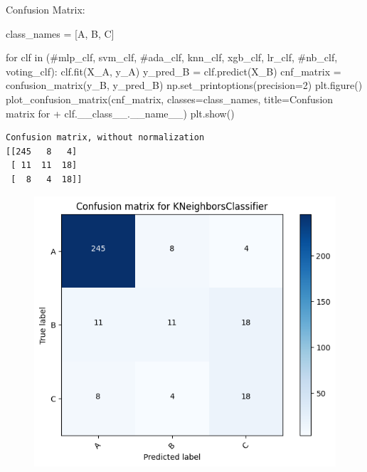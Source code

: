 \documentclass[
  letterpaper,
  DIV=11,
  numbers=noendperiod]{scrartcl}
\newenvironment{Shaded}{\begin{snugshade}}{\end{snugshade}}
\newcommand{\CommentTok}[1]{\textcolor[rgb]{0.37,0.37,0.37}{#1}}
\newcommand{\ControlFlowTok}[1]{\textcolor[rgb]{0.00,0.23,0.31}{#1}}
\newcommand{\DecValTok}[1]{\textcolor[rgb]{0.68,0.00,0.00}{#1}}
\newcommand{\KeywordTok}[1]{\textcolor[rgb]{0.00,0.23,0.31}{#1}}
\newcommand{\NormalTok}[1]{\textcolor[rgb]{0.00,0.23,0.31}{#1}}
\newcommand{\OperatorTok}[1]{\textcolor[rgb]{0.37,0.37,0.37}{#1}}
\newcommand{\StringTok}[1]{\textcolor[rgb]{0.13,0.47,0.30}{#1}}
\newcommand{\VariableTok}[1]{\textcolor[rgb]{0.07,0.07,0.07}{#1}}
\begin{document}
Confusion Matrix:

\begin{Shaded}
\begin{Highlighting}[]
\NormalTok{class\_names }\OperatorTok{=}\NormalTok{ [}\StringTok{\textquotesingle{}A\textquotesingle{}}\NormalTok{, }\StringTok{\textquotesingle{}B\textquotesingle{}}\NormalTok{, }\StringTok{\textquotesingle{}C\textquotesingle{}}\NormalTok{]}

\ControlFlowTok{for}\NormalTok{ clf }\KeywordTok{in}\NormalTok{ (}\CommentTok{\#mlp\_clf, svm\_clf, \#ada\_clf,}
\NormalTok{            knn\_clf, xgb\_clf, lr\_clf, }\CommentTok{\#nb\_clf,}
\NormalTok{            voting\_clf):}
\NormalTok{    clf.fit(X\_A, y\_A)}
\NormalTok{    y\_pred\_B }\OperatorTok{=}\NormalTok{ clf.predict(X\_B)}
\NormalTok{    cnf\_matrix }\OperatorTok{=}\NormalTok{ confusion\_matrix(y\_B, y\_pred\_B)}
\NormalTok{    np.set\_printoptions(precision}\OperatorTok{=}\DecValTok{2}\NormalTok{)}
\NormalTok{    plt.figure()}
\NormalTok{    plot\_confusion\_matrix(cnf\_matrix, classes}\OperatorTok{=}\NormalTok{class\_names,}
\NormalTok{                          title}\OperatorTok{=}\StringTok{\textquotesingle{}Confusion matrix for \textquotesingle{}} \OperatorTok{+}\NormalTok{ clf.\_\_class\_\_.}\VariableTok{\_\_name\_\_}\NormalTok{)}
\NormalTok{    plt.show()}
\end{Highlighting}
\end{Shaded}

\begin{verbatim}
Confusion matrix, without normalization
[[245   8   4]
 [ 11  11  18]
 [  8   4  18]]
\end{verbatim}

\begin{figure}[H]

{\centering \includegraphics{transformer-paper4_files/figure-pdf/cell-13-output-2.png}

}

\end{figure}
\end{document}
